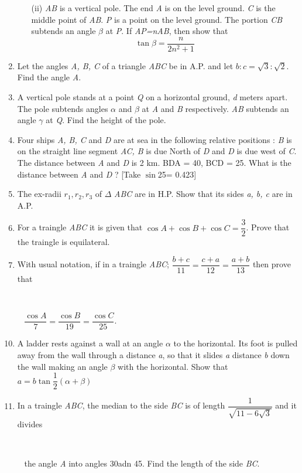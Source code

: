 \documentclass[journal,12pt,twocolumn]{IEEEtran}
\begin{document}
\begin{enumerate}
\begin{itemize}
 \item[(ii)] \textsl{AB} is a vertical pole. The end \textsl{A} is on the level ground. \textsl{C} is the middle point of \textsl{AB}. \textsl{P} is a point on the level ground. The portion \textsl{CB} subtends an angle $\beta$ at \textsl{P}. If \textsl{AP=nAB}, then show that $$\tan\beta=\dfrac{n}{2n^2+1}$$ 
 \end{itemize}
 \item Let the angles \textsl{A, B, C} of a triangle \textsl{ABC} be in A.P. and let $b:c=\sqrt{3}:\sqrt{2}$. Find the angle \textsl{A}.
 \item A vertical pole stands at a point \textsl{Q} on a horizontal ground, \textsl{d} meters apart. The pole subtends angles $\alpha$ and $\beta$ at \textsl{A} and \textsl{B} respectively. \textsl{AB} subtends an angle $\gamma$ at \textsl{Q}. Find the height of the pole.
 \item Four ships \textsl{A, B, C} and \textsl{D} are at sea in the following relative positions : \textsl{B} is on the straight line segment \textsl{AC, B} is due North of \textsl{D} and \textsl{D} is due west of \textsl{C}. The distance between \textsl{A} and \textsl{D} is 2 km. \angle BDA = 40\degree, \angle BCD = 25\degree. What is the distance between \textsl{A} and \textsl{D} ? [Take $\sin$25\degree = 0.423] 
 \item The ex-radii \textsl{$r_1, r_2, r_3$} of $\Delta$ \textsl{ABC} are in H.P. Show that its sides \textsl{a, b, c} are in A.P.
 \item For a traingle \textsl{ABC} it is given that $\cos A+\cos B+\cos C=\dfrac{3}{2}$. Prove that the traingle is equilateral.
 \item With usual notation, if in a traingle \textsl{ABC};
 $\dfrac{b+c}{11}=\dfrac{c+a}{12}=\dfrac{a+b}{13}$ then prove that \item[~] \item[~]$\dfrac{\cos A}{7}=\dfrac{\cos B}{19}=\dfrac{\cos C}{25}$.
 \item A ladder rests against a wall at an angle $\alpha$ to the horizontal. Its foot is pulled away from the wall through a distance \textsl{a}, so that it slides \textsl{a} distance \textsl{b} down the wall making an angle $\beta$ with the horizontal. Show that $a=b\tan\dfrac{1}{2}\left(\alpha+\beta\right)$
 \item In a traingle \textsl{ABC}, the median to the side \textsl{BC} is of length $\dfrac{1}{\sqrt{11-6\sqrt{3}}}$ and it divides \item[~] \item[~]the angle \textsl{A} into angles 30\degree adn 45\degree. Find the length of the side \textsl{BC}.

\end{enumerate}
\end{document}

